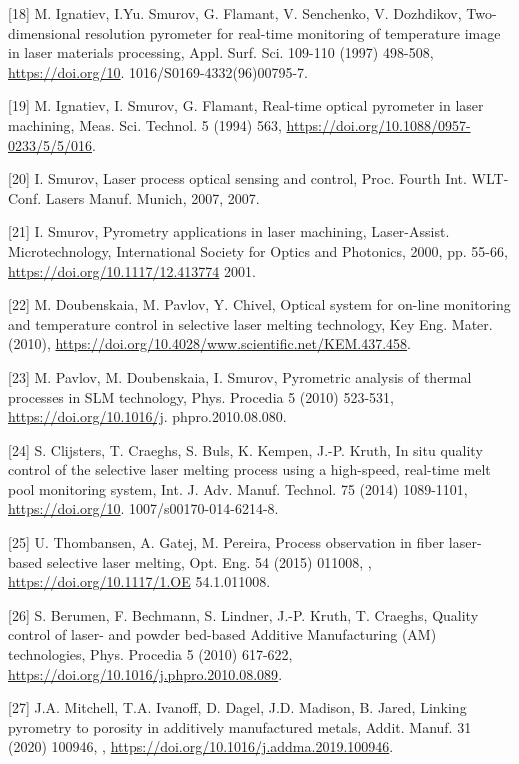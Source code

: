 \documentclass[10pt]{article}
\begin{document}
[18] M. Ignatiev, I.Yu. Smurov, G. Flamant, V. Senchenko, V. Dozhdikov, Two-dimensional resolution pyrometer for real-time monitoring of temperature image in laser materials processing, Appl. Surf. Sci. 109-110 (1997) 498-508, \href{https://doi.org/10}{https://doi.org/10}. 1016/S0169-4332(96)00795-7.

[19] M. Ignatiev, I. Smurov, G. Flamant, Real-time optical pyrometer in laser machining, Meas. Sci. Technol. 5 (1994) 563, \href{https://doi.org/10.1088/0957-0233/5/5/016}{https://doi.org/10.1088/0957-0233/5/5/016}.

[20] I. Smurov, Laser process optical sensing and control, Proc. Fourth Int. WLT-Conf. Lasers Manuf. Munich, 2007, 2007.

[21] I. Smurov, Pyrometry applications in laser machining, Laser-Assist. Microtechnology, International Society for Optics and Photonics, 2000, pp. 55-66, \href{https://doi.org/10.1117/12.413774}{https://doi.org/10.1117/12.413774} 2001.

[22] M. Doubenskaia, M. Pavlov, Y. Chivel, Optical system for on-line monitoring and temperature control in selective laser melting technology, Key Eng. Mater. (2010), \href{https://doi.org/10.4028/www.scientific.net/KEM.437.458}{https://doi.org/10.4028/www.scientific.net/KEM.437.458}.

[23] M. Pavlov, M. Doubenskaia, I. Smurov, Pyrometric analysis of thermal processes in SLM technology, Phys. Procedia 5 (2010) 523-531, \href{https://doi.org/10.1016/j}{https://doi.org/10.1016/j}. phpro.2010.08.080.

[24] S. Clijsters, T. Craeghs, S. Buls, K. Kempen, J.-P. Kruth, In situ quality control of the selective laser melting process using a high-speed, real-time melt pool monitoring system, Int. J. Adv. Manuf. Technol. 75 (2014) 1089-1101, \href{https://doi.org/10}{https://doi.org/10}. 1007/s00170-014-6214-8.

[25] U. Thombansen, A. Gatej, M. Pereira, Process observation in fiber laser-based selective laser melting, Opt. Eng. 54 (2015) 011008, , \href{https://doi.org/10.1117/1.OE}{https://doi.org/10.1117/1.OE} 54.1.011008.

[26] S. Berumen, F. Bechmann, S. Lindner, J.-P. Kruth, T. Craeghs, Quality control of laser- and powder bed-based Additive Manufacturing (AM) technologies, Phys. Procedia 5 (2010) 617-622, \href{https://doi.org/10.1016/j.phpro.2010.08.089}{https://doi.org/10.1016/j.phpro.2010.08.089}.

[27] J.A. Mitchell, T.A. Ivanoff, D. Dagel, J.D. Madison, B. Jared, Linking pyrometry to porosity in additively manufactured metals, Addit. Manuf. 31 (2020) 100946, , \href{https://doi.org/10.1016/j.addma.2019.100946}{https://doi.org/10.1016/j.addma.2019.100946}.
\end{document}
